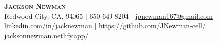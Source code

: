 \documentclass[letterpaper,11pt]{article}
\begin{document}

\begin{center}
    \textbf{\Huge \scshape Jackson Newman} \\ \vspace{1pt}
    \small Redwood City, CA, 94065 $|$ 650-649-8204 $|$ \href{mailto:jpnewman167@gmail.com}{\underline{jpnewman167@gmail.com}} $|$ 
    \href{https://www.linkedin.com/in/jacknewman/}{\underline{linkedin.com/in/jacknewman}} $|$
    \href{https://github.com/JNewman-cell/}{\underline{https://github.com/JNewman-cell/}} $|$
    \href{https://jacksonnewman.netlify.app/}{\underline{jacksonnewman.netlify.app/}}
\end{center}


\end{document}
